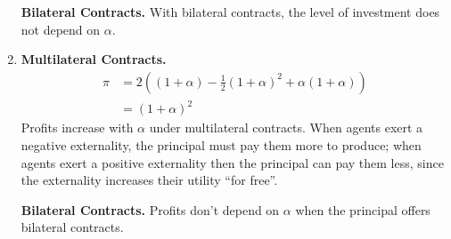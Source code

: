 \begin{enumerate}[label=\alph*)]
  \textbf{Bilateral Contracts.}
  With bilateral contracts, the level of investment does not depend on $\alpha$.

\item
  \textbf{Multilateral Contracts.}
  \begin{align*}
    \pi &= 2 \left((1 + \alpha) - \frac{1}{2}(1 + \alpha)^2 + \alpha (1 + \alpha)\right)\\
    &= (1 + \alpha)^2
  \end{align*}
  Profits increase with $\alpha$ under multilateral contracts. When agents exert a negative externality, the principal must pay them more to produce; when agents exert a positive externality then the principal can pay them less, since the externality increases their utility ``for free''.

  \textbf{Bilateral Contracts.}
  Profits don't depend on $\alpha$ when the principal offers bilateral contracts.
\end{enumerate}
